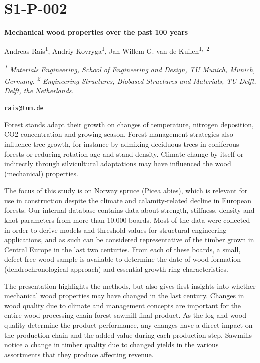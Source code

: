 \documentclass[
]{book}
\begin{document}
\hypertarget{s1-p-002}{%
\section*{S1-P-002}\label{s1-p-002}}

\textbf{Mechanical wood properties over the past 100 years}

Andreas Rais\textsuperscript{1}, Andriy Kovryga\textsuperscript{1}, Jan-Willem G. van de Kuilen\textsuperscript{1,~2}

\textsuperscript{\emph{1}} \emph{Materials Engineering, School of Engineering and Design, TU Munich, Munich, Germany. \textsuperscript{2} Engineering Structures, Biobased Structures and Materials, TU Delft, Delft, the Netherlands.}

\href{mailto:rais@tum.de}{\nolinkurl{rais@tum.de}}

Forest stands adapt their growth on changes of temperature, nitrogen deposition, CO2-concentration and growing season. Forest management strategies also influence tree growth, for instance by admixing deciduous trees in coniferous forests or reducing rotation age and stand density. Climate change by itself or indirectly through silvicultural adaptations may have influenced the wood (mechanical) properties.

The focus of this study is on Norway spruce (Picea abies), which is relevant for use in construction despite the climate and calamity-related decline in European forests. Our internal database contains data about strength, stiffness, density and knot parameters from more than 10.000 boards. Most of the data were collected in order to derive models and threshold values for structural engineering applications, and as such can be considered representative of the timber grown in Central Europe in the last two centuries. From each of these boards, a small, defect-free wood sample is available to determine the date of wood formation (dendrochronological approach) and essential growth ring characteristics.

The presentation highlights the methods, but also gives first insights into whether mechanical wood properties may have changed in the last century. Changes in wood quality due to climate and management concepts are important for the entire wood processing chain forest-sawmill-final product. As the log and wood quality determine the product performance, any changes have a direct impact on the production chain and the added value during each production step. Sawmills notice a change in timber quality due to changed yields in the various assortments that they produce affecting revenue.
\end{document}
